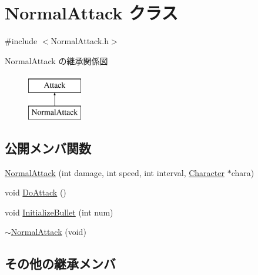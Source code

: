 \hypertarget{class_normal_attack}{\section{Normal\+Attack クラス}
\label{class_normal_attack}
}


{\ttfamily \#include $<$Normal\+Attack.\+h$>$}

Normal\+Attack の継承関係図\begin{figure}[H]
\begin{center}
\leavevmode
\includegraphics[height=2.000000cm]{class_normal_attack}
\end{center}
\end{figure}
\subsection*{公開メンバ関数}
\begin{DoxyCompactItemize}
\item 
\hyperlink{class_normal_attack_aef592f0fdd9752de416b82f0c076a0b1}{Normal\+Attack} (int damage, int speed, int interval, \hyperlink{class_character}{Character} $\ast$chara)
\item 
void \hyperlink{class_normal_attack_a39d8e90194dca1a89ba961163b7d0e18}{Do\+Attack} ()
\item 
void \hyperlink{class_normal_attack_a95c5acd8739229d71395a8423c32a455}{Initialize\+Bullet} (int num)
\item 
\hyperlink{class_normal_attack_a61caca3c8aa81ecfa576fb86e4032964}{$\sim$\+Normal\+Attack} (void)
\end{DoxyCompactItemize}
\subsection*{その他の継承メンバ}


